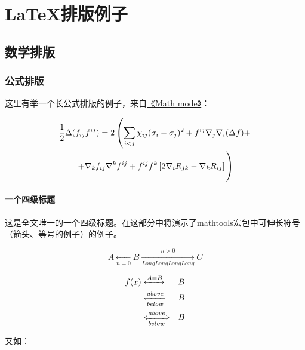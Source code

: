 
\chapter{ \LaTeX 排版例子}
\label{chap:example}

\section{数学排版}
\label{sec:matheq}

\subsection{公式排版}
\label{sec:eqformat}

这里有举一个长公式排版的例子，来自\href{http://www.tex.ac.uk/tex-archive/info/math/voss/mathmode/Mathmode.pdf}{《Math mode》}：

\begin {multline}
  \frac {1}{2}\Delta (f_{ij}f^{ij})=
  2\left (\sum _{i<j}\chi _{ij}(\sigma _{i}-
    \sigma _{j}) ^{2}+ f^{ij}\nabla _{j}\nabla _{i}(\Delta f)+\right .\\
  \left .+\nabla _{k}f_{ij}\nabla ^{k}f^{ij}+
    f^{ij}f^{k}\left [2\nabla _{i}R_{jk}-
      \nabla _{k}R_{ij}\right ]\vphantom {\sum _{i<j}}\right )
\end{multline}

\subsubsection{一个四级标题}
\label{sec:depth4}

这是全文唯一的一个四级标题。在这部分中将演示了mathtools宏包中可伸长符号（箭头、等号的例子）的例子。

\begin{displaymath}
    A \xleftarrow[n=0]{} B \xrightarrow[LongLongLongLong]{n>0} C 
\end{displaymath}

\begin{eqnarray}
  f(x) & \xleftrightarrow[]{A=B}  & B \\
  & \xleftharpoondown[below]{above} & B \nonumber \\
  & \xLeftrightarrow[below]{above} & B
\end{eqnarray}

又如：

